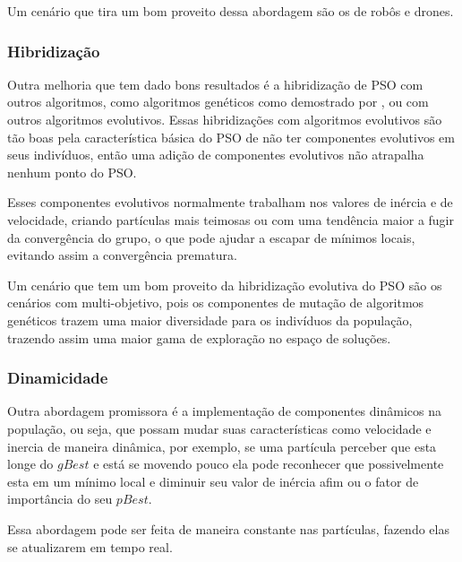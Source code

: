             Um cenário que tira um bom proveito dessa abordagem são os de robôs e drones.            

        \subsubsection{Hibridização}
            Outra melhoria que tem dado bons resultados é a hibridização de PSO com outros algoritmos, como algoritmos genéticos como demostrado por \cite{carvalho2014}, ou com outros algoritmos evolutivos.\newline
            Essas hibridizações com algoritmos evolutivos são tão boas pela característica básica do PSO de não ter componentes evolutivos em seus indivíduos, então uma adição de componentes evolutivos não atrapalha nenhum ponto do PSO. \newline
            
            Esses componentes evolutivos normalmente trabalham nos valores de inércia e de velocidade, criando partículas mais teimosas ou com uma tendência maior a fugir da convergência do grupo, o que pode ajudar a escapar de mínimos locais, evitando assim a convergência prematura.\newline
            
            Um cenário que tem um bom proveito da hibridização evolutiva do PSO são os cenários com multi-objetivo, pois os componentes de mutação de algoritmos genéticos trazem uma maior diversidade para os indivíduos da população, trazendo assim uma maior gama de exploração no espaço de soluções.

        \subsubsection{Dinamicidade}
            Outra abordagem promissora é a implementação de componentes dinâmicos na população, ou seja, que possam mudar suas características como velocidade e inercia de maneira dinâmica, por exemplo, se uma partícula perceber que esta longe do $gBest$ e está se movendo pouco ela pode reconhecer que possivelmente esta em um mínimo local e diminuir seu valor de inércia afim ou o fator de importância do seu $pBest$.\newline
            
            Essa abordagem pode ser feita de maneira constante nas partículas, fazendo elas se atualizarem em tempo real.


